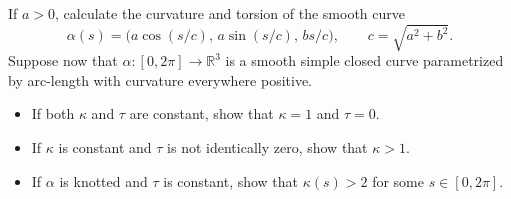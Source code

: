 \begin{problem}
\label{prob:cp-vii-0042}
If $a>0$, calculate the curvature and torsion of the smooth curve
	\[
	\alpha(s)=\bigl(a\cos(s/c),\,a\sin(s/c),\,bs/c\bigr),
	\qquad c=\sqrt{a^2+b^2}.
	\]
	Suppose now that $\alpha:[0,2\pi]\to\mathbb{R}^3$ is a smooth simple closed curve parametrized by arc-length
	with curvature everywhere positive.
	\begin{itemize}
		\item If both $\kappa$ and $\tau$ are constant, show that $\kappa=1$ and $\tau=0$.
		\item If $\kappa$ is constant and $\tau$ is not identically zero, show that $\kappa>1$.
		\item If $\alpha$ is knotted and $\tau$ is constant, show that $\kappa(s)>2$ for some $s\in[0,2\pi]$.
	\end{itemize}
\end{problem}

